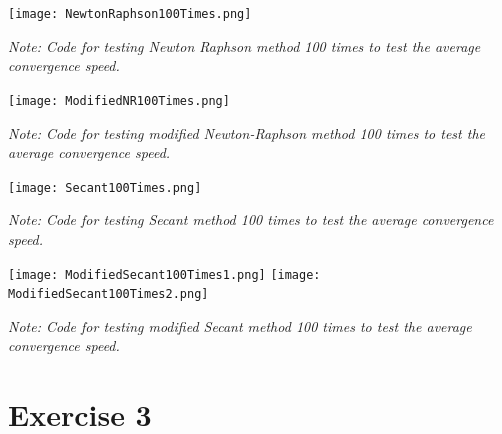 \documentclass{article}
\begin{document}
\begin{tcolorbox}[colback=gray!10, colframe=gray!80, width=\textwidth, sharp corners]
    \centering 
   
    \texttt{[image: NewtonRaphson100Times.png]} 
      
    \small\textit{Note: Code for testing Newton Raphson method 100 times to test the average convergence speed.}
\end{tcolorbox}

\begin{tcolorbox}[colback=gray!10, colframe=gray!80, width=\textwidth, sharp corners]
    \centering 
   
    \texttt{[image: ModifiedNR100Times.png]} 
      
    \small\textit{Note: Code for testing modified Newton-Raphson method 100 times to test the average convergence speed.}
\end{tcolorbox}

\begin{tcolorbox}[colback=gray!10, colframe=gray!80, width=\textwidth, sharp corners]
    \centering 
   
    \texttt{[image: Secant100Times.png]} 
      
    \small\textit{Note: Code for testing Secant method 100 times to test the average convergence speed.}
\end{tcolorbox}

\begin{tcolorbox}[colback=gray!10, colframe=gray!80, width=\textwidth, sharp corners]
    \centering 
    \texttt{[image: ModifiedSecant100Times1.png]} 
    \texttt{[image: ModifiedSecant100Times2.png]} 

    \vspace{0.5cm} 
    
    \small\textit{Note: Code for testing modified Secant method 100 times to test the average convergence speed.}
\end{tcolorbox}

\newpage
\section{Exercise 3}
\end{document}
